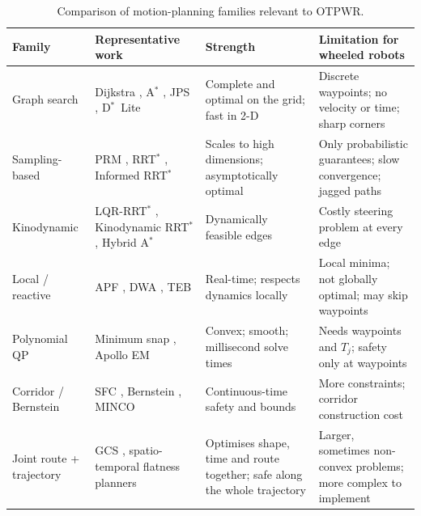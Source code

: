 \documentclass[11pt,a4paper]{article}
\begin{document}
\begin{table}[t]
  \centering
  \caption{Comparison of motion-planning families relevant to OTPWR.}
  \label{tab:lit}
  \small
  \begin{tabularx}{\textwidth}{@{}l L L L@{}}
    \toprule
    \textbf{Family} & \textbf{Representative work} & \textbf{Strength} & \textbf{Limitation for wheeled robots} \\
    \midrule
    Graph search &
      Dijkstra \citep{dijkstra1959note}, A$^\ast$ \citep{hart1968formal}, JPS \citep{harabor2011online}, D$^\ast$~Lite \citep{koenig2002dstar} &
      Complete and optimal on the grid; fast in 2-D &
      Discrete waypoints; no velocity or time; sharp corners \\
    \addlinespace
    Sampling-based &
      PRM \citep{kavraki1996probabilistic}, RRT$^\ast$ \citep{karaman2011sampling}, Informed RRT$^\ast$ \citep{gammell2014informed} &
      Scales to high dimensions; asymptotically optimal &
      Only probabilistic guarantees; slow convergence; jagged paths \\
    \addlinespace
    Kinodynamic &
      LQR-RRT$^\ast$ \citep{perez2012lqr}, Kinodynamic RRT$^\ast$ \citep{webb2013kinodynamic}, Hybrid A$^\ast$ \citep{dolgov2010path} &
      Dynamically feasible edges &
      Costly steering problem at every edge \\
    \addlinespace
    Local / reactive &
      APF \citep{khatib1986realtime}, DWA \citep{fox1997dwa}, TEB \citep{rosmann2017integrated} &
      Real-time; respects dynamics locally &
      Local minima; not globally optimal; may skip waypoints \\
    \addlinespace
    Polynomial QP &
      Minimum snap \citep{mellinger2011minimum,richter2016polynomial}, Apollo EM \citep{fan2018baidu} &
      Convex; smooth; millisecond solve times &
      Needs waypoints and $T_j$; safety only at waypoints \\
    \addlinespace
    Corridor / Bernstein &
      SFC \citep{liu2017planning}, Bernstein \citep{gao2018online}, MINCO \citep{wang2022geometrically} &
      Continuous-time safety and bounds &
      More constraints; corridor construction cost \\
    \addlinespace
    Joint route + trajectory &
      GCS \citep{marcucci2023gcs}, spatio-temporal flatness planners \citep{han2024efficient,zhang2024universal} &
      Optimises shape, time and route together; safe along the whole trajectory &
      Larger, sometimes non-convex problems; more complex to implement \\
    \bottomrule
  \end{tabularx}
\end{table}
\end{document}
